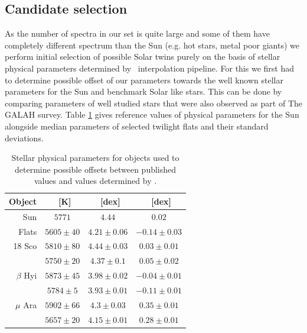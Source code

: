 \subsection{Candidate selection}
\label{sec:05_candidates}
As the number of spectra in our set is quite large and some of them have completely different spectrum than the Sun (e.g. hot stars, metal poor giants) we perform initial selection of possible Solar twins purely on the basis of stellar physical parameters determined by \TC\ interpolation pipeline. For this we first had to determine possible offset of our parameters towards the well known stellar parameters for the Sun and benchmark Solar like stars. This can be done by comparing parameters of well studied stars that were also observed as part of The GALAH survey. Table \ref{tab:params} gives reference values of physical parameters for the Sun alongside median parameters of selected twilight flats and their standard deviations. 

\begin{table}
	\centering
	\begin{tabular}{r | c | c | c}
		Object & \Teff\ [K] & \Logg\ [dex] & \Feh\ [dex] \\ \hline
		Sun & $5771$ & $4.44$ & $0.02$ \\ 
		Flats & $5605 \pm 40$ & $4.21 \pm 0.06$ & $-0.14 \pm 0.03$ \\ \hline
		18 Sco & $5810 \pm 80$ & $4.44 \pm 0.03$ & $0.03 \pm 0.01$ \\
		& $5750 \pm 20 $ & $4.37 \pm 0.1$ & $ 0.05 \pm 0.02$ \\ \hline
		$\beta$ Hyi & $5873 \pm 45$ & $3.98 \pm 0.02$ & $-0.04 \pm 0.01$ \\
		& $5784 \pm 5$ & $3.93 \pm 0.01$ & $-0.11 \pm 0.01$ \\ \hline
		$\mu$ Ara & $5902 \pm 66$ & $4.3 \pm 0.03$ & $0.35 \pm 0.01$ \\
		& $5657 \pm 20$ & $4.15 \pm 0.01$ & $0.28 \pm 0.01$ \\ \hline
	\end{tabular}
	\caption{Stellar physical parameters for objects used to determine possible offsets between published values and values determined by \TC. }
	\label{tab:params}
\end{table}

